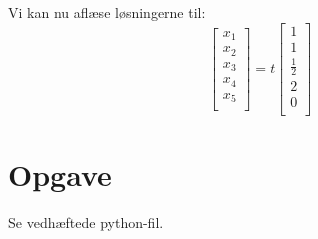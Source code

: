 \documentclass[a4paper,12pt]{article}
\begin{document}
Vi kan nu aflæse løsningerne til:
\[
\left[\begin{array}{c}
    x_1\\
    x_2\\
    x_3\\
    x_4\\
    x_5\\
\end{array}\right]
=
t
\left[\begin{array}{c}
    1\\
    1\\
    \frac{1}{2}\\
    2\\
    0\\
\end{array}\right]
\]

\section[Opgave]{Opgave}
Se vedhæftede python-fil.
\end{document}
